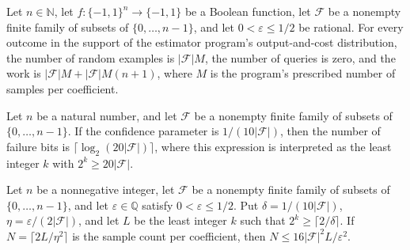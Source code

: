 \begin{theorem}
\label{FABL.finiteFamilyFourierEstimatorProgram_cost_components}
\leanok
{}
Let $n\in\mathbb{N}$, let $f:\{-1,1\}^n\to\{-1,1\}$ be a Boolean function, let
$\mathcal{F}$ be a nonempty finite family of subsets of $\{0,\ldots,n-1\}$, and let
$0<\varepsilon\le 1/2$ be rational. For every outcome in the support of the estimator
program's output-and-cost distribution, the number of random examples is
$|\mathcal{F}|M$, the number of queries is zero, and the work is
$|\mathcal{F}|M+|\mathcal{F}|M(n+1)$, where $M$ is the program's prescribed number of
samples per coefficient.
\end{theorem}

\begin{theorem}
\label{FABL.finiteFamilyCoefficientFailureBits_eq}
\leanok
{}
Let $n$ be a natural number, and let $\mathcal{F}$ be a nonempty finite family of
subsets of $\{0,\ldots,n-1\}$. If the confidence parameter is $1/(10|\mathcal{F}|)$,
then the number of failure bits is $\lceil\log_2(20|\mathcal{F}|)\rceil$, where this
expression is interpreted as the least integer $k$ with $2^k\ge 20|\mathcal{F}|$.
\end{theorem}

\begin{theorem}
\label{FABL.finiteFamilySamplesPerCoefficient_cast_le}
\leanok
{}
Let $n$ be a nonnegative integer, let $\mathcal F$ be a nonempty finite family of
subsets of $\{0,\ldots,n-1\}$, and let $\varepsilon\in\mathbb Q$ satisfy
$0<\varepsilon\leq 1/2$. Put $\delta=1/(10|\mathcal F|)$, $\eta=\varepsilon/(2|\mathcal
F|)$, and let $L$ be the least integer $k$ such that $2^k\geq\lceil 2/\delta\rceil$. If
$N=\lceil 2L/\eta^2\rceil$ is the sample count per coefficient, then $N\leq 16|\mathcal
F|^2L/\varepsilon^2$.
\end{theorem}

